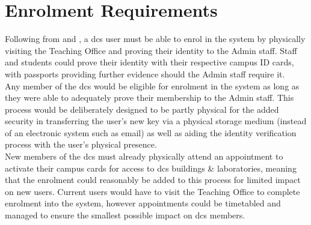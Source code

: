 \section{Enrolment Requirements}
\label{sec:analysis_enrolment}

Following from  and , a \acrfull{dcs} user must be able to enrol in the \theResServer system by physically visiting the Teaching Office and proving their identity to the Admin staff. Staff and students could prove their identity with their respective campus ID cards, with passports providing further evidence should the Admin staff require it.\\
Any member of the \acrfull{dcs} would be eligible for enrolment in the system as long as they were able to adequately prove their membership to the Admin staff. This process would be deliberately designed to be partly physical for the added security in transferring the user's new key via a physical storage medium (instead of an electronic system such as email) as well as aiding the identity verification process with the user's physical presence.\\
New members of the \acrshort{dcs} must already physically attend an appointment to activate their campus cards for access to \acrshort{dcs} buildings \& laboratories, meaning that the \theResServer enrolment could reasonably be added to this process for limited impact on new users. Current users would have to visit the Teaching Office to complete enrolment into the system, however appointments could be timetabled and managed to ensure the smallest possible impact on \acrshort{dcs} members.
